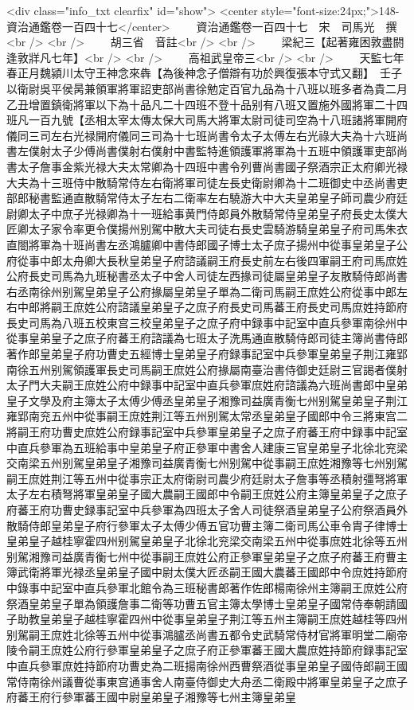 <div class="info_txt clearfix" id="show">
<center style="font-size:24px;">148-資治通鑑卷一百四十七</center>
  　　資治通鑑卷一百四十七　宋　司馬光　撰<br />
<br />
　　胡三省　音註<br />
<br />
　　梁紀三【起著雍困敦盡閼逢敦牂凡七年】<br />
<br />
　　高祖武皇帝三<br />
<br />
　　天監七年春正月魏潁川太守王神念來犇【為後神念子僧辯有功於興復張本守式又翻】　壬子以衛尉吳平侯昺兼領軍將軍詔吏部尚書徐勉定百官九品為十八班以班多者為貴二月乙丑增置鎮衛將軍以下為十品凡二十四班不登十品别有八班又置施外國將軍二十四班凡一百九號【丞相太宰太傳太保大司馬大將軍太尉司徒司空為十八班諸將軍開府儀同三司左右光禄開府儀同三司為十七班尚書令太子太傅左右光祿大夫為十六班尚書左僕射太子少傅尚書僕射右僕射中書監特進領護軍將軍為十五班中領護軍吏部尚書太子詹事金紫光禄大夫太常卿為十四班中書令列曹尚書國子祭酒宗正太府卿光禄大夫為十三班侍中散騎常侍左右衛將軍司徒左長史衛尉卿為十二班御史中丞尚書吏部郎秘書監通直散騎常侍太子左右二衛率左右驍游大中大夫皇弟皇子師司農少府廷尉卿太子中庶子光禄卿為十一班給事黄門侍郎員外散騎常侍皇弟皇子府長史太僕大匠卿太子家令率更令僕揚州别駕中散大夫司徒右長史雲騎游騎皇弟皇子府司馬朱衣直閤將軍為十班尚書左丞鴻臚卿中書侍郎國子博士太子庶子揚州中從事皇弟皇子公府從事中郎太舟卿大長秋皇弟皇子府諮議嗣王府長史前左右後四軍嗣王府司馬庶姓公府長史司馬為九班秘書丞太子中舍人司徒左西掾司徒屬皇弟皇子友散騎侍郎尚書右丞南徐州别駕皇弟皇子公府掾屬皇弟皇子單為二衛司馬嗣王庶姓公府從事中郎左右中郎將嗣王庶姓公府諮議皇弟皇子之庶子府長史司馬蕃王府長史司馬庶姓持節府長史司馬為八班五校東宫三校皇弟皇子之庶子府中録事中記室中直兵參軍南徐州中從事皇弟皇子之庶子府蕃王府諮議為七班太子洗馬通直散騎侍郎司徒主簿尚書侍郎著作郎皇弟皇子府功曹史五經博士皇弟皇子府録事記室中兵參軍皇弟皇子荆江雍郢南徐五州别駕領護軍長史司馬嗣王庶姓公府掾屬南臺治書侍御史廷尉三官謁者僕射太子門大夫嗣王庶姓公府中録事中記室中直兵參軍庶姓府諮議為六班尚書郎中皇弟皇子文學及府主簿太子太傅少傅丞皇弟皇子湘豫司益廣青衡七州别駕皇弟皇子荆江雍郢南兖五州中從事嗣王庶姓荆江等五州别駕太常丞皇弟皇子國郎中令三將東宫二將嗣王府功曹史庶姓公府録事記室中兵參軍皇弟皇子之庶子府蕃王府中録事中記室中直兵參軍為五班給事中皇弟皇子府正參軍中書舍人建康三官皇弟皇子北徐北兖梁交南梁五州别駕皇弟皇子湘豫司益廣青衡七州别駕中從事嗣王庶姓湘豫等七州别駕嗣王庶姓荆江等五州中從事宗正太府衛尉司農少府廷尉太子詹事等丞積射彊弩將軍太子左右積弩將軍皇弟皇子國大農嗣王國郎中令嗣王庶姓公府主簿皇弟皇子之庶子府蕃王府功曹史録事記室中兵參軍為四班太子舍人司徒祭酒皇弟皇子公府祭酒員外散騎侍郎皇弟皇子府行參軍太子太傅少傅五官功曹主簿二衛司馬公車令胄子律博士皇弟皇子越桂寧霍四州别駕皇弟皇子北徐北兖梁交南梁五州中從事庶姓北徐等五州别駕湘豫司益廣青衡七州中從事嗣王庶姓公府正參軍皇弟皇子之庶子府蕃王府曹主簿武衛將軍光禄丞皇弟皇子國中尉太僕大匠丞嗣王國大農蕃王國郎中令庶姓持節府中錄事中記室中直兵參軍北館令為三班秘書郎著作佐郎楊南徐州主簿嗣王庶姓公府祭酒皇弟皇子單為領護詹事二衛等功曹五官主簿太學博士皇弟皇子國常侍奉朝請國子助教皇弟皇子越桂寧霍四州中從事皇弟皇子荆江等五州主簿嗣王庶姓越桂等四州别駕嗣王庶姓北徐等五州中從事鴻臚丞尚書五都令史武騎常侍材官將軍明堂二廟帝陵令嗣王庶姓公府行參軍皇弟皇子之庶子府正參軍蕃王國大農庶姓持節府録事記室中直兵參軍庶姓持節府功曹史為二班揚南徐州西曹祭酒從事皇弟皇子國侍郎嗣王國常侍南徐州議曹從事東宫通事舍人南臺侍御史大舟丞二衛殿中將軍皇弟皇子之庶子府蕃王府行參軍蕃王國中尉皇弟皇子湘豫等七州主簿皇弟皇